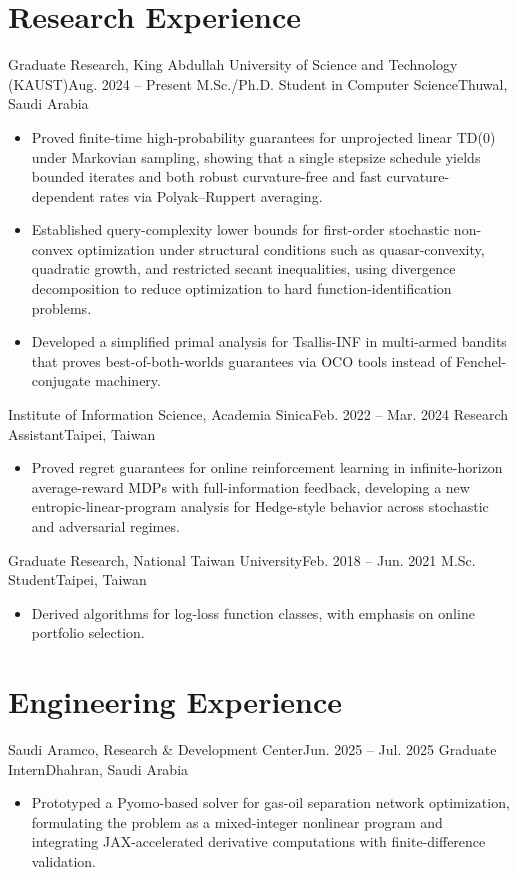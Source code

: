 \documentclass[10pt, letterpaper]{article}
\begin{document}
\section{Research Experience}
\entry
{Graduate Research, King Abdullah University of Science and Technology (KAUST)}{Aug. 2024 -- Present}
{M.Sc./Ph.D. Student in Computer Science}{Thuwal, Saudi Arabia}
\begin{itemize}
  \item Proved finite-time high-probability guarantees for unprojected linear TD(0) under Markovian sampling, showing that a single stepsize schedule yields bounded iterates and both robust curvature-free and fast curvature-dependent rates via Polyak--Ruppert averaging.
  \item Established query-complexity lower bounds for first-order stochastic non-convex optimization under structural conditions such as quasar-convexity, quadratic growth, and restricted secant inequalities, using divergence decomposition to reduce optimization to hard function-identification problems.
  \item Developed a simplified primal analysis for Tsallis-INF in multi-armed bandits that proves best-of-both-worlds guarantees via OCO tools instead of Fenchel-conjugate machinery.
\end{itemize}

\entry
{Institute of Information Science, Academia Sinica}{Feb. 2022 -- Mar. 2024}
{Research Assistant}{Taipei, Taiwan}
\begin{itemize}
  \item Proved regret guarantees for online reinforcement learning in infinite-horizon average-reward MDPs with full-information feedback, developing a new entropic-linear-program analysis for Hedge-style behavior across stochastic and adversarial regimes.
\end{itemize}

\entry
{Graduate Research, National Taiwan University}{Feb. 2018 -- Jun. 2021}
{M.Sc. Student}{Taipei, Taiwan}
\begin{itemize}
  \item Derived algorithms for log-loss function classes, with emphasis on online portfolio selection.
\end{itemize}

\section{Engineering Experience}
\entry
{Saudi Aramco, Research \& Development Center}{Jun. 2025 -- Jul. 2025}
{Graduate Intern}{Dhahran, Saudi Arabia}
\begin{itemize}
  \item Prototyped a Pyomo-based solver for gas-oil separation network optimization, formulating the problem as a mixed-integer nonlinear program and integrating JAX-accelerated derivative computations with finite-difference validation.
\end{itemize}
\end{document}
